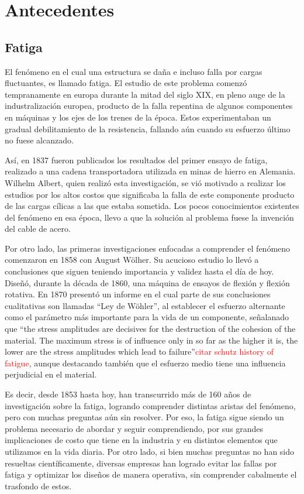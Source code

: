 \chapter{Antecedentes}

\section{Fatiga}
El fenómeno en el cual una estructura se daña e incluso falla por cargas fluctuantes, es llamado fatiga. El estudio de este problema comenzó tempranamente en europa durante la mitad del siglo XIX, en pleno auge de la industralización europea, producto de la falla repentina de algunos componentes en máquinas y los ejes de los trenes de la época. Estos experimentaban un gradual debilitamiento de la resistencia, fallando aún cuando su esfuerzo último no fuese alcanzado. 

Así, en 1837 fueron publicados los resultados del primer ensayo de fatiga, realizado a una cadena transportadora utilizada en minas de hierro en Alemania. Wilhelm Albert, quien realizó esta investigación, se vió motivado a realizar los estudios por los altos costos que significaba la falla de este componente producto de las cargas cílicas a las que estaba sometida. Los pocos conocimientos existentes del fenómeno en esa época, llevo a que la solución al problema fuese la invención del cable de acero.

Por otro lado, las primeras investigaciones enfocadas a comprender el fenómeno comenzaron en 1858 con August Wölher. Su acucioso estudio lo llevó a conclusiones que siguen teniendo importancia y validez hasta el día de hoy. Diseñó, durante la década de 1860, una máquina de ensayos de flexión y flexión rotativa. En 1870 presentó un informe en el cual parte de sus conclusiones cualitativas son llamadas ``Ley de Wöhler'', al establecer el esfuerzo alternante como el parámetro más importante para la vida de un componente, señalanado que ``the stress amplitudes are decisives for the destruction of the cohesion of the material. The maximum stress is of influence only in so far as the higher it is, the lower are the stress amplitudes which lead to failure''\textcolor{red}{citar schutz history of fatigue}, aunque destacando también que el esfuerzo medio tiene una influencia perjudicial en el material. 

Es decir, desde 1853 hasta hoy, han transcurrido más de 160 años de investigación sobre la fatiga, logrando comprender distintas aristas del fenómeno, pero con muchas preguntas aún sin resolver. Por eso, la fatiga sigue siendo un problema necesario de abordar y seguir comprendiendo, por sus grandes implicaciones de costo que tiene en la industria y en distintos elementos que utilizamos en la vida diaria. Por otro lado, si bien muchas preguntas no han sido resueltas científicamente, diversas empresas han logrado evitar las fallas por fatiga y optimizar los diseños de manera operativa, sin comprender cabalmente el trasfondo de estos.

